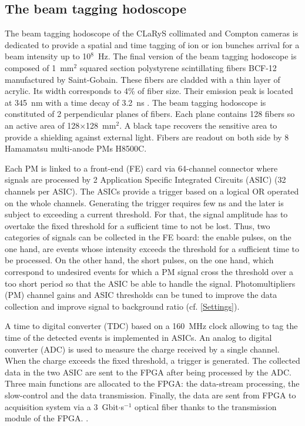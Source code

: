 \documentclass[a4paper,11pt]{article}
\begin{document}
\subsection{The beam tagging hodoscope}
The beam tagging hodoscope of the CLaRyS collimated and Compton cameras is dedicated to provide a spatial and time tagging of ion or ion bunches arrival for a beam intensity up to 10$^{8}$~Hz.
The final version of the beam tagging hodoscope is composed  of 1~mm$^{2}$ squared section polystyrene scintillating fibers BCF-12 manufactured by Saint-Gobain. These fibers are cladded with a thin layer of acrylic. Its width corresponds to 4\% of fiber size. Their emission peak is located at 345~nm with a time decay of 3.2~ns \cite{SaintGobain2017}.
The beam tagging hodoscope is constituted of 2 perpendicular planes of fibers. Each plane contains 128 fibers so an active area of 128$\times$128~mm$^{2}$. A black tape recovers the sensitive area to provide a shielding against external light. Fibers are readout on both side by 8 Hamamatsu multi-anode PMs H8500C.

Each PM is linked to a front-end (FE) card via 64-channel connector where signals are processed by 2 Application Specific Integrated Circuits (ASIC) (32 channels per ASIC). The ASICs provide a trigger based on a logical OR operated on the whole channels. Generating the trigger requires few ns and the later is subject to exceeding a current threshold. For that, the signal amplitude has to overtake the fixed threshold for a sufficient time to not be lost. Thus, two categories of signals can be collected in the FE board: the enable pulses, on the one hand, are events whose intensity exceeds the threshold for a sufficient time to be processed. On the other hand, the short pulses, on the one hand, which correspond to undesired events for which a PM signal cross the threshold over a too short period so that the ASIC be able to handle the signal.
Photomultipliers (PM) channel gains and ASIC thresholds can be tuned to improve the data collection and improve signal to background ratio (cf. \ref{Settings}).

A time to digital converter (TDC) based on a 160~MHz clock allowing to tag the time of the detected events is implemented in ASICs. An analog to digital converter (ADC) is used to measure the charge received by a single channel. When the charge exceeds the fixed threshold, a trigger is generated. The collected data in the two ASIC are sent to the FPGA after being processed by the ADC. Three main functions are allocated to the FPGA: the data-stream processing, the slow-control and the data transmission. Finally, the data are sent from FPGA to acquisition system via a 3~Gbit$\cdot$s$^{-1}$ optical fiber thanks to the transmission module of the FPGA. \cite{deng2013, Chen2017, Chen2019}.
\end{document}
